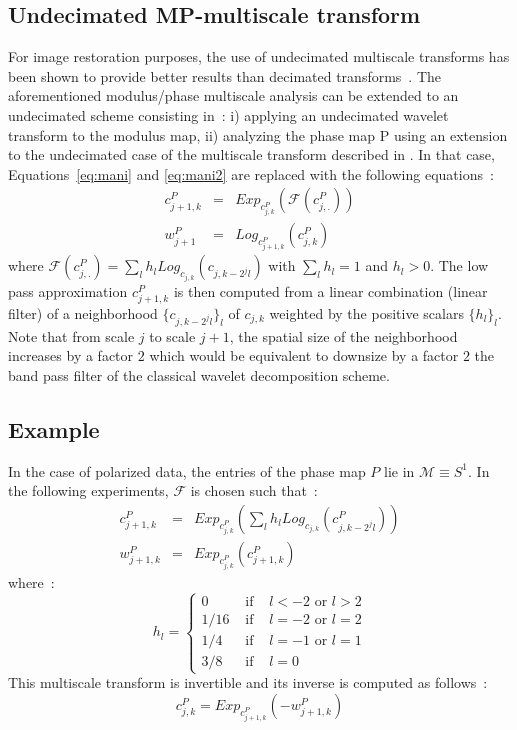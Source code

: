 \subsection{Undecimated MP-multiscale transform}
For image restoration purposes, the use of undecimated multiscale transforms has been shown to provide better results than decimated transforms~\citep{starck:book98,starck:book06}. 
The aforementioned modulus/phase multiscale analysis can be extended to an undecimated scheme consisting in~: i) applying an undecimated wavelet transform to the modulus map, 
ii) analyzing the phase map P using an extension to the undecimated case of the multiscale transform described in \citep{rahman05}. In that case, Equations~\eqref{eq:mani} 
and \eqref{eq:mani2} are replaced with the following equations~:
\begin{eqnarray}\label{eq:maniu}
c_{j+1,k}^P & = & Exp_{c_{j,k}^P} ( \mathcal{F}(c_{j,.}^P))\\
w_{j+1}^P & = & Log_{c_{j+1,k}^P}\left(c_{j,k}^P\right)  
\end{eqnarray}
where $\mathcal{F}(c_{j,.}^P) = \sum_l h_{l} Log_{c_{j,k}}\left(c_{j,k-2^jl}\right)$ with $\sum_l h_l = 1$ and $h_l > 0$. The low pass 
approximation $c_{j+1,k}^P$ is then computed from a linear combination (linear filter) of a neighborhood $\{c_{j,k-2^jl}\}_l$ of $c_{j,k}$ 
weighted by the positive scalars $\{h_l\}_l$. Note that from scale $j$ to scale $j+1$, the spatial size of the neighborhood increases 
by a factor $2$ which would be equivalent to downsize by a factor $2$ the band pass filter of the classical wavelet decomposition scheme.\\

\subsection{Example}
In the case of polarized data, the entries of the phase map $P$ lie in $\mathcal{M} \equiv S^1$. In the following experiments, $\mathcal{F}$ is chosen such that~:
\begin{eqnarray}
c_{j+1,k}^P & = & Exp_{c_{j,k}^P}\left(\sum_l h_{l}Log_{c_{j,k}}\left(c_{j,k-2^jl}^P\right)\right)  \\
w_{j+1,k}^P & = & Exp_{c_{j,k}^P} \left(c_{j+1,k}^P\right)
\end{eqnarray}
where~:
\begin{equation}
h_l = \left\{
\begin{array}{ccc}
0 & \mbox{ if } & l < -2 \mbox{ or } l > 2 \\
1/16 &\mbox{ if }& l=-2 \mbox{ or } l=2 \\
1/4 &\mbox{ if }& l=-1 \mbox{ or } l=1\\
3/8 &\mbox{ if }& l= 0
\end{array}
\right.
\end{equation}
This multiscale transform is invertible and its inverse is computed as follows~:
\begin{equation}
 c_{j,k}^P  =  Exp_{c_{j+1,k}^P } \left(- w_{j+1,k}^P\right)  
\end{equation}

